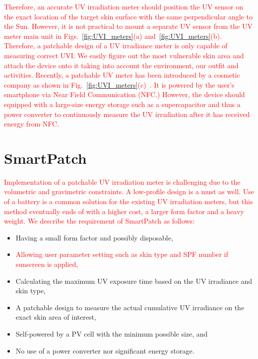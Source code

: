 \documentclass[journal]{IEEEtran}
\begin{document}
\textcolor{red}{Therefore, an accurate UV irradiation meter should position the UV sensor on the exact location of the target skin surface with the same perpendicular angle to the Sun. However, it is not practical to mount a separate UV sensor from the \textcolor{red}{UV meter main unit in Figs.~\ref{fig:UVI_meters}(a) and~\ref{fig:UVI_meters}(b)}. Therefore, a patchable design of a UV irradiance meter is only capable of measuring correct UVI. We easily figure out the most vulnerable skin area and attach the device onto it taking into account the environment, our outfit and activities. Recently, a patchable UV meter has been introduced by a cosmetic company as shown in Fig.~\ref{fig:UVI_meters}(c)~\cite{LOreal}. It is powered by the user's smartphone via Near Field Communication (NFC.) However, the device should equipped with a large-size energy storage such as a supercapacitor and thus a power converter to continuously measure the UV irradiation after it has received energy from NFC.}

\section{SmartPatch}

\textcolor{red}{Implementation of a patchable UV irradiation meter is challenging due to the volumetric and gravimetric constraints. A low-profile design is a must as well. Use of a battery is a common solution for the existing UV irradiation meters, but this method eventually ends of with a higher cost, a larger form factor and a heavy weight. We describe the requirement of SmartPatch as follows:}

\begin{itemize}
\item Having a small form factor and possibly disposable,
\item \textcolor{red}{Allowing user parameter setting such as skin type and SPF number if sunscreen is applied,}
\item Calculating the maximum UV exposure time based on the UV irradiance and skin type,
\item A patchable design to measure the actual cumulative UV irradiance on the exact skin area of interest,
\item Self-powered by a PV cell with the minimum possible size, and
\item No use of a power converter nor significant energy storage.
\end{itemize}
\end{document}
